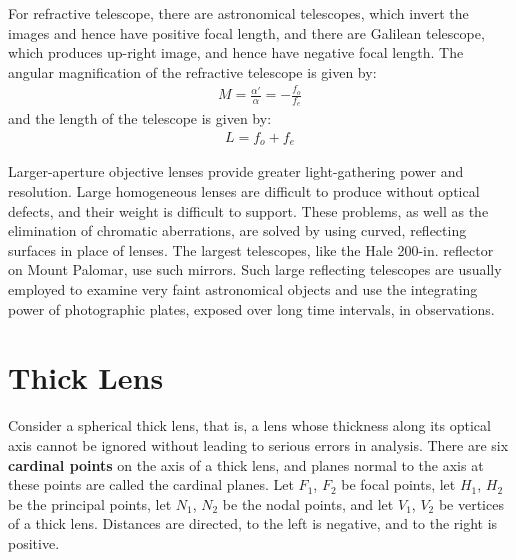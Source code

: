 \documentclass[11pt]{book}
\theoremstyle{break}
\theoremstyle{break}
\begin{document}
For refractive telescope, there are  astronomical telescopes, which invert the images and hence have positive focal length, and there are Galilean telescope, which produces up-right image, and hence have negative focal length. The angular magnification of the refractive telescope is given by:
\begin{align*}
M = \frac{\alpha'}{\alpha} = -\frac{f_o}{f_e}
\end{align*}
and the length of the telescope is given by:
\begin{align*}
L = f_o + f_e
\end{align*}


Larger-aperture objective lenses provide greater light-gathering power and resolution. Large homogeneous lenses are difficult to produce without optical defects, and their weight is difficult to support. These problems, as well as the elimination of chromatic aberrations, are solved by using curved, reflecting surfaces in place of lenses. The largest telescopes, like the Hale 200-in. reflector on Mount Palomar, use such mirrors. Such large reflecting telescopes are usually employed to examine very faint astronomical objects and use the integrating power of photographic plates, exposed over long time intervals, in observations.
 
 
\newpage
\section[Thick Lens]{\color{red}Thick Lens\color{black}}
Consider a spherical thick lens, that is, a lens whose thickness along its optical
axis cannot be ignored without leading to serious errors in analysis. There are six \textbf{cardinal points} on the axis of a thick lens, and planes normal to the axis at these points are called the cardinal planes. Let $F_1$, $F_2$ be focal points, let $H_1$, $H_2$ be the principal points, let $N_1$, $N_2$ be the nodal points, and let $V_1$, $V_2$ be vertices of a thick lens. Distances are directed, to the left is negative, and to the right is positive. \\
\end{document}
